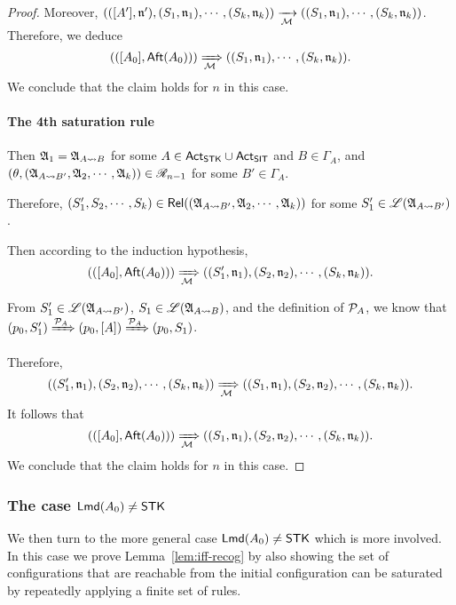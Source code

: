 \begin{proof}
Moreover, $(([A'], \mathfrak{n}'), (S_1, \mathfrak{n}_1), \cdots, (S_k, \mathfrak{n}_k)) \xrightarrow[{\mathcal{M} }]{} ((S_1, \mathfrak{n}_1), \cdots, (S_k, \mathfrak{n}_k))$. Therefore, we deduce 
$$(([A_0], {\sf Aft}(A_0))) \xRightarrow[{\mathcal{M} }]{} ((S_1, \mathfrak{n}_1), \cdots, (S_k, \mathfrak{n}_k)).$$ 
We conclude that the claim holds for $n$ in this case. 

\paragraph*{The 4th saturation rule} Then ${\mathfrak{A} }_1 = {\mathfrak{A} }_{A\rightsquigarrow B}$ for some $A \in {\sf Act}_{\sf STK} \cup {\sf Act}_{\sf SIT}$ and $B \in \Gamma_A$,  and $(\theta, ({\mathfrak{A} }_{A\rightsquigarrow B'}, {\mathfrak{A} }_2, \cdots, {\mathfrak{A} }_k)) \in \mathscr{R}_{n-1}$ for  some $B' \in \Gamma_A$. 

Therefore, $(S'_1, S_2, \cdots, S_k) \in \mathsf{Rel}(({\mathfrak{A} }_{A\rightsquigarrow B'}, {\mathfrak{A} }_2, \cdots, {\mathfrak{A} }_k))$ for some $S'_1 \in {\mathscr{L} }({\mathfrak{A} }_{A\rightsquigarrow B'})$. 

Then according to the induction hypothesis, 
$$(([A_0], {\sf Aft}(A_0))) \xRightarrow[{\mathcal{M} }]{} ((S'_1, \mathfrak{n}_1), (S_2, \mathfrak{n}_2), \cdots, (S_k, \mathfrak{n}_k)).$$

From $S'_1 \in {\mathscr{L} }({\mathfrak{A} }_{A\rightsquigarrow B'})$, $S_1 \in {\mathscr{L} }({\mathfrak{A} }_{A\rightsquigarrow B})$, and the definition of ${\mathcal{P} }_A$, we know that $(p_0, S'_1) \xRightarrow{{\mathcal{P} }_A} (p_0, [A]) \xRightarrow{{\mathcal{P} }_A} (p_0, S_1)$. 

Therefore, 
$$((S'_1, \mathfrak{n}_1), (S_2, \mathfrak{n}_2), \cdots, (S_k, \mathfrak{n}_k)) \xRightarrow[{\mathcal{M} }]{} ((S_1, \mathfrak{n}_1), (S_2, \mathfrak{n}_2), \cdots, (S_k, \mathfrak{n}_k)).$$
It follows that 
$$(([A_0], {\sf Aft}(A_0))) \xRightarrow[{\mathcal{M} }]{} ((S_1, \mathfrak{n}_1), (S_2, \mathfrak{n}_2), \cdots, (S_k, \mathfrak{n}_k)).$$
We conclude that the claim holds for $n$ in this case. 
\end{proof}



\subsubsection{The case ${\sf Lmd}(A_0) \neq \mathsf{STK}$}\label{sec:lmamass-nostk}
%
We then turn to the more general case ${\sf Lmd}(A_0)\neq\mathsf{STK}$ which is more involved. In this case we prove Lemma~\ref{lem:iff-recog} by also showing the set of configurations that are reachable from the initial configuration can be saturated by repeatedly applying a finite set of rules.

